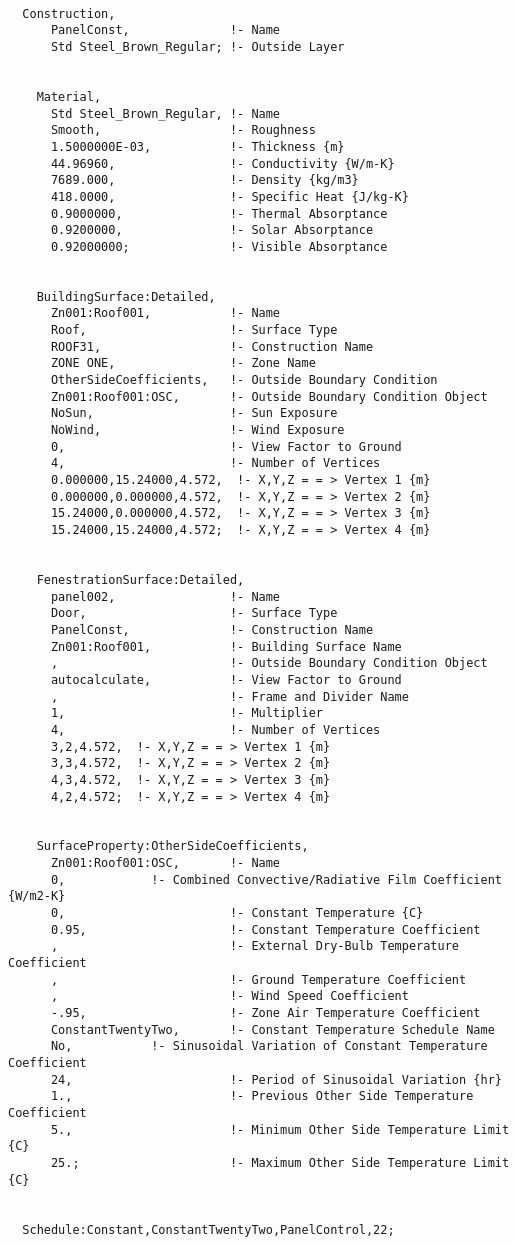\begin{lstlisting}

  Construction,
      PanelConst,              !- Name
      Std Steel_Brown_Regular; !- Outside Layer


    Material,
      Std Steel_Brown_Regular, !- Name
      Smooth,                  !- Roughness
      1.5000000E-03,           !- Thickness {m}
      44.96960,                !- Conductivity {W/m-K}
      7689.000,                !- Density {kg/m3}
      418.0000,                !- Specific Heat {J/kg-K}
      0.9000000,               !- Thermal Absorptance
      0.9200000,               !- Solar Absorptance
      0.92000000;              !- Visible Absorptance


    BuildingSurface:Detailed,
      Zn001:Roof001,           !- Name
      Roof,                    !- Surface Type
      ROOF31,                  !- Construction Name
      ZONE ONE,                !- Zone Name
      OtherSideCoefficients,   !- Outside Boundary Condition
      Zn001:Roof001:OSC,       !- Outside Boundary Condition Object
      NoSun,                   !- Sun Exposure
      NoWind,                  !- Wind Exposure
      0,                       !- View Factor to Ground
      4,                       !- Number of Vertices
      0.000000,15.24000,4.572,  !- X,Y,Z = = > Vertex 1 {m}
      0.000000,0.000000,4.572,  !- X,Y,Z = = > Vertex 2 {m}
      15.24000,0.000000,4.572,  !- X,Y,Z = = > Vertex 3 {m}
      15.24000,15.24000,4.572;  !- X,Y,Z = = > Vertex 4 {m}


    FenestrationSurface:Detailed,
      panel002,                !- Name
      Door,                    !- Surface Type
      PanelConst,              !- Construction Name
      Zn001:Roof001,           !- Building Surface Name
      ,                        !- Outside Boundary Condition Object
      autocalculate,           !- View Factor to Ground
      ,                        !- Frame and Divider Name
      1,                       !- Multiplier
      4,                       !- Number of Vertices
      3,2,4.572,  !- X,Y,Z = = > Vertex 1 {m}
      3,3,4.572,  !- X,Y,Z = = > Vertex 2 {m}
      4,3,4.572,  !- X,Y,Z = = > Vertex 3 {m}
      4,2,4.572;  !- X,Y,Z = = > Vertex 4 {m}


    SurfaceProperty:OtherSideCoefficients,
      Zn001:Roof001:OSC,       !- Name
      0,            !- Combined Convective/Radiative Film Coefficient {W/m2-K}
      0,                       !- Constant Temperature {C}
      0.95,                    !- Constant Temperature Coefficient
      ,                        !- External Dry-Bulb Temperature Coefficient
      ,                        !- Ground Temperature Coefficient
      ,                        !- Wind Speed Coefficient
      -.95,                    !- Zone Air Temperature Coefficient
      ConstantTwentyTwo,       !- Constant Temperature Schedule Name
      No,           !- Sinusoidal Variation of Constant Temperature Coefficient
      24,                      !- Period of Sinusoidal Variation {hr}
      1.,                      !- Previous Other Side Temperature Coefficient
      5.,                      !- Minimum Other Side Temperature Limit {C}
      25.;                     !- Maximum Other Side Temperature Limit {C}


  Schedule:Constant,ConstantTwentyTwo,PanelControl,22;
\end{lstlisting}
